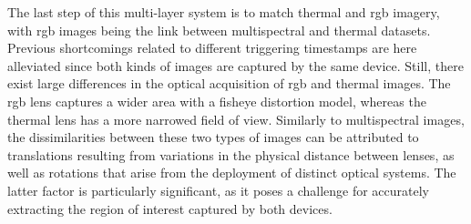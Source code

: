 The last step of this multi-layer system is to match thermal and \acrshort{rgb} imagery, with \acrshort{rgb} images being the link between multispectral and thermal datasets. Previous shortcomings related to different triggering timestamps are here alleviated since both kinds of images are captured by the same device. Still, there exist large differences in the optical acquisition of \acrshort{rgb} and thermal images. The \acrshort{rgb} lens captures a wider area with a fisheye distortion model, whereas the thermal lens has a more narrowed field of view. Similarly to multispectral images, the dissimilarities between these two types of images can be attributed to translations resulting from variations in the physical distance between lenses, as well as rotations that arise from the deployment of distinct optical systems. The latter factor is particularly significant, as it poses a challenge for accurately extracting the region of interest captured by both devices.

